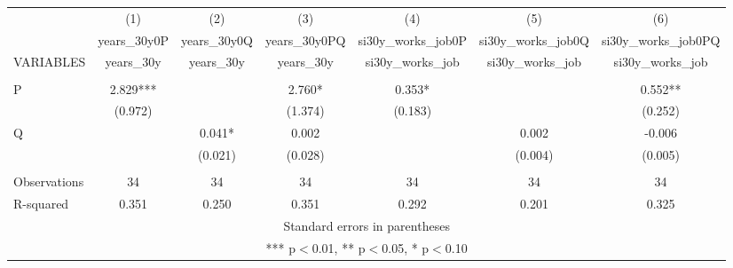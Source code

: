 \begin{tabular}{lcccccc} \hline
 & (1) & (2) & (3) & (4) & (5) & (6) \\
 & years\_30y0P & years\_30y0Q & years\_30y0PQ & si30y\_works\_job0P & si30y\_works\_job0Q & si30y\_works\_job0PQ \\
VARIABLES & years\_30y & years\_30y & years\_30y & si30y\_works\_job & si30y\_works\_job & si30y\_works\_job \\ \hline
 &  &  &  &  &  &  \\
P & 2.829*** &  & 2.760* & 0.353* &  & 0.552** \\
 & (0.972) &  & (1.374) & (0.183) &  & (0.252) \\
Q &  & 0.041* & 0.002 &  & 0.002 & -0.006 \\
 &  & (0.021) & (0.028) &  & (0.004) & (0.005) \\
 &  &  &  &  &  &  \\
Observations & 34 & 34 & 34 & 34 & 34 & 34 \\
 R-squared & 0.351 & 0.250 & 0.351 & 0.292 & 0.201 & 0.325 \\ \hline
\multicolumn{7}{c}{ Standard errors in parentheses} \\
\multicolumn{7}{c}{ *** p$<$0.01, ** p$<$0.05, * p$<$0.10} \\
\end{tabular}

